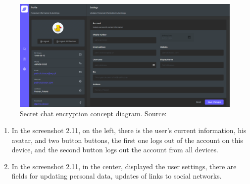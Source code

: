 \begin{figure}[H]
    \centering
    \includegraphics[width=1\textwidth]{Pictures/Messenger-3}
    \caption{Secret chat encryption concept diagram. Source: }\label{fig:figure11}
\end{figure}
\begin{enumerate}
    \item In the screenshot 2.11, on the left, there is the user's current information, his avatar, and two button buttons,
    the first one logs out of the account on this device,
    and the second button logs out the account from all devices.
    \item In the screenshot 2.11, in the center, displayed the user settings, there are fields for updating personal data,
    updates of links to social networks.
\end{enumerate}